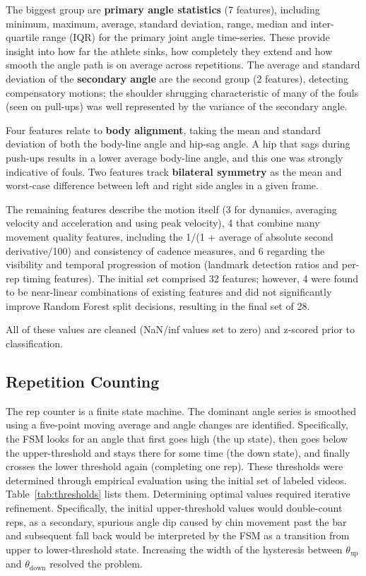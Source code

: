 \documentclass[conference]{IEEEtran}
\begin{document}
The biggest group are \textbf{primary angle statistics} (7 features), including minimum, maximum, average, standard deviation, range, median and inter-quartile range (IQR) for the primary joint angle time-series. These provide insight into how far the athlete sinks, how completely they extend and how smooth the angle path is on average across repetitions. The average and standard deviation of the \textbf{secondary angle} are the second group (2 features), detecting compensatory motions; the shoulder shrugging characteristic of many of the fouls (seen on pull-ups) was well represented by the variance of the secondary angle.

Four features relate to \textbf{body alignment}, taking the mean and standard deviation of both the body-line angle and hip-sag angle. A hip that sags during push-ups results in a lower average body-line angle, and this one was strongly indicative of fouls. Two features track \textbf{bilateral symmetry} as the mean and worst-case difference between left and right side angles in a given frame.

The remaining features describe the motion itself (3 for dynamics, averaging velocity and acceleration and using peak velocity), 4 that combine many movement quality features, including the 1/(1 + average of absolute second derivative/100) and consistency of cadence measures, and 6 regarding the visibility and temporal progression of motion (landmark detection ratios and per-rep timing features). The initial set comprised 32 features; however, 4 were found to be near-linear combinations of existing features and did not significantly improve Random Forest split decisions, resulting in the final set of 28.

All of these values are cleaned (NaN/inf values set to zero) and z-scored prior to classification.

\subsection{Repetition Counting}
The rep counter is a finite state machine. The dominant angle series is smoothed using a five-point moving average and angle changes are identified. Specifically, the FSM looks for an angle that first goes high (the up state), then goes below the upper-threshold and stays there for some time (the down state), and finally crosses the lower threshold again (completing one rep). These thresholds were determined through empirical evaluation using the initial set of labeled videos. Table~\ref{tab:thresholds} lists them. Determining optimal values required iterative refinement. Specifically, the initial upper-threshold values would double-count reps, as a secondary, spurious angle dip caused by chin movement past the bar and subsequent fall back would be interpreted by the FSM as a transition from upper to lower-threshold state. Increasing the width of the hysteresis between $\theta_{\text{up}}$ and $\theta_{\text{down}}$ resolved the problem.
\end{document}
